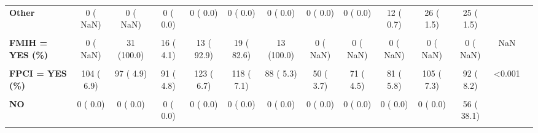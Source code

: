 \documentclass[
]{article}
\begin{document}
\begin{table}[H]
\begin{tabular}[t]{>{\raggedright\arraybackslash}p{5em}ccccccccccccc}
\textbf{Other} & 0 (  NaN) & 0 (  NaN) & 0 (  0.0) & 0 (  0.0) & 0 (  0.0) & 0 (  0.0) & 0 (  0.0) & 0 (  0.0) & 12 (  0.7) & 26 (  1.5) & 25 (  1.5) &  & \\
\textbf{\cellcolor{gray!10}{FMI = YES (\%)}} & \cellcolor{gray!10}{0 (  NaN)} & \cellcolor{gray!10}{31 (  8.2)} & \cellcolor{gray!10}{16 (  4.1)} & \cellcolor{gray!10}{14 (  0.8)} & \cellcolor{gray!10}{25 (  1.5)} & \cellcolor{gray!10}{13 (  0.8)} & \cellcolor{gray!10}{0 (  NaN)} & \cellcolor{gray!10}{0 (  NaN)} & \cellcolor{gray!10}{0 (  NaN)} & \cellcolor{gray!10}{0 (  NaN)} & \cellcolor{gray!10}{0 (  NaN)} & \cellcolor{gray!10}{NaN} & \cellcolor{gray!10}{}\\
\textbf{FMIH = YES (\%)} & 0 (  NaN) & 31 (100.0) & 16 (  4.1) & 13 ( 92.9) & 19 ( 82.6) & 13 (100.0) & 0 (  NaN) & 0 (  NaN) & 0 (  NaN) & 0 (  NaN) & 0 (  NaN) & NaN & \\
\textbf{\cellcolor{gray!10}{FNCHOS = YES (\%)}} & \cellcolor{gray!10}{60 ( 16.6)} & \cellcolor{gray!10}{67 ( 17.7)} & \cellcolor{gray!10}{59 ( 15.1)} & \cellcolor{gray!10}{78 ( 22.5)} & \cellcolor{gray!10}{64 ( 23.0)} & \cellcolor{gray!10}{61 ( 25.8)} & \cellcolor{gray!10}{66 ( 37.1)} & \cellcolor{gray!10}{71 ( 34.6)} & \cellcolor{gray!10}{90 ( 40.0)} & \cellcolor{gray!10}{46 ( 21.3)} & \cellcolor{gray!10}{46 ( 23.7)} & \cellcolor{gray!10}{<0.001} & \cellcolor{gray!10}{}\\
\textbf{FPCI = YES (\%)} & 104 (  6.9) & 97 (  4.9) & 91 (  4.8) & 123 (  6.7) & 118 (  7.1) & 88 (  5.3) & 50 (  3.7) & 71 (  4.5) & 81 (  5.8) & 105 (  7.3) & 92 (  8.2) & <0.001 & \\
\textbf{\cellcolor{gray!10}{FPCIT (\%)}} & \cellcolor{gray!10}{} & \cellcolor{gray!10}{} & \cellcolor{gray!10}{} & \cellcolor{gray!10}{} & \cellcolor{gray!10}{} & \cellcolor{gray!10}{} & \cellcolor{gray!10}{} & \cellcolor{gray!10}{} & \cellcolor{gray!10}{} & \cellcolor{gray!10}{} & \cellcolor{gray!10}{} & \cellcolor{gray!10}{<0.001} & \cellcolor{gray!10}{}\\
\textbf{NO} & 0 (  0.0) & 0 (  0.0) & 0 (  0.0) & 0 (  0.0) & 0 (  0.0) & 0 (  0.0) & 0 (  0.0) & 0 (  0.0) & 0 (  0.0) & 0 (  0.0) & 56 ( 38.1) &  & \\
\textbf{\cellcolor{gray!10}{SCHEDULED}} & \cellcolor{gray!10}{63 ( 64.9)} & \cellcolor{gray!10}{80 ( 82.5)} & \cellcolor{gray!10}{73 ( 82.0)} & \cellcolor{gray!10}{75 ( 72.1)} & \cellcolor{gray!10}{89 ( 76.7)} & \cellcolor{gray!10}{71 ( 82.6)} & \cellcolor{gray!10}{37 ( 72.5)} & \cellcolor{gray!10}{58 ( 82.9)} & \cellcolor{gray!10}{64 ( 82.1)} & \cellcolor{gray!10}{86 ( 82.7)} & \cellcolor{gray!10}{86 ( 58.5)} & \cellcolor{gray!10}{} & \cellcolor{gray!10}{}\\

\end{tabular}
\end{table}
\end{document}
